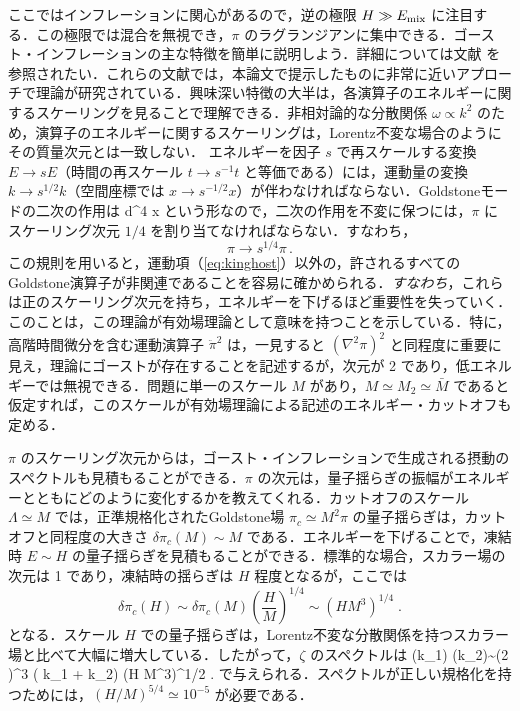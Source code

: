 ここではインフレーションに関心があるので，逆の極限 $H \gg E_{\rm mix}$ に注目する．この極限では混合を無視でき，$\pi$ のラグランジアンに集中できる．ゴースト・インフレーションの主な特徴を簡単に説明しよう．詳細については文献
\cite{Arkani-Hamed:2003pdi,Arkani-Hamed:2003juy,Senatore:2004rj} を参照されたい．これらの文献では，本論文で提示したものに非常に近いアプローチで理論が研究されている．興味深い特徴の大半は，各演算子のエネルギーに関するスケーリングを見ることで理解できる．非相対論的な分散関係 $\omega \propto k^2$ のため，演算子のエネルギーに関するスケーリングは，Lorentz不変な場合のようにその質量次元とは一致しない．
エネルギーを因子 $s$ で再スケールする変換 $E\rightarrow s E$（時間の再スケール $t\rightarrow s^{-1} t$ と等価である）には，運動量の変換 $k\rightarrow s^{1/2}k$（空間座標では $x\rightarrow
s^{-1/2}x$）が伴わなければならない．Goldstoneモードの二次の作用は
\be
\label{eq:kinghost}
\int d^4 x 
\ee
という形なので，二次の作用を不変に保つには，$\pi$ にスケーリング次元 $1/4$ を割り当てなければならない．すなわち，
\begin{equation}
\pi\rightarrow s^{1/4}\pi \, .
\end{equation}
この規則を用いると，運動項（\ref{eq:kinghost}）以外の，許されるすべてのGoldstone演算子が非関連であることを容易に確かめられる．{\em すなわち}，これらは正のスケーリング次元を持ち，エネルギーを下げるほど重要性を失っていく．このことは，この理論が有効場理論として意味を持つことを示している．特に，高階時間微分を含む運動演算子 $\ddot \pi^2$ は，一見すると $(\nabla^2\pi)^2$ と同程度に重要に見え，理論にゴーストが存在することを記述するが，次元が 2 であり，低エネルギーでは無視できる．問題に単一のスケール $M$ があり，$M \simeq M_2 \simeq \bar M$ であると仮定すれば，このスケールが有効場理論による記述のエネルギー・カットオフも定める．

$\pi$ のスケーリング次元からは，ゴースト・インフレーションで生成される摂動のスペクトルも見積もることができる．$\pi$ の次元は，量子揺らぎの振幅がエネルギーとともにどのように変化するかを教えてくれる．カットオフのスケール $\Lambda \simeq M$ では，正準規格化されたGoldstone場 $\pi_c \simeq M^2 \pi $ の量子揺らぎは，カットオフと同程度の大きさ $\delta \pi_c (M)\sim M$ である．エネルギーを下げることで，凍結時 $E \sim H$ の量子揺らぎを見積もることができる．標準的な場合，スカラー場の次元は 1 であり，凍結時の揺らぎは $H$ 程度となるが，ここでは
\begin{equation}
\delta\pi_c(H) \sim \delta\pi_c(M)
\left(\frac{H}{M}\right)^{1/4}\sim \left(H M^3\right)^{1/4} \;.
\end{equation}
となる．スケール $H$ での量子揺らぎは，Lorentz不変な分散関係を持つスカラー場と比べて大幅に増大している．したがって，$\zeta$ のスペクトルは \cite{Arkani-Hamed:2003juy}
\begingroup\addtolength{\belowdisplayskip}{-2pt}
\be
\label{eq:spectrumzetaghost}
\langle \zeta(\vec k_1) \zeta(\vec k_2)\rangle \sim (2 \pi)^3 \delta(\vec
k_1 + \vec k_2)   (H M^3)^{1/2}  \;.
\ee
\endgroup
で与えられる．スペクトルが正しい規格化を持つためには，$(H/M)^{5/4} \simeq
10^{-5}$ が必要である．

